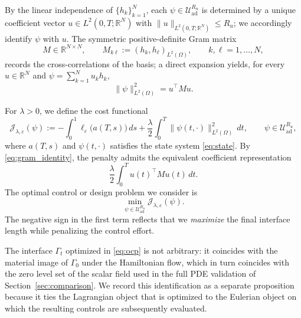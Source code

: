 \documentclass[12pt, reqno]{amsart}
\theoremstyle{plain}
\theoremstyle{definition}
\numberwithin{equation}{section}
\numberwithin{figure}{section}
\numberwithin{algorithm}{section}
\begin{document}
By the linear independence of $\{h_k\}_{k=1}^N$, each $\psi\in\mathcal U_{\mathrm{ad}}^{R_u}$ is determined by a unique coefficient vector $u\in L^2(0,T;\mathbb R^N)$ with $\|u\|_{L^2(0,T;\mathbb R^N)}\le R_u$; we accordingly identify $\psi$ with $u$. The symmetric positive-definite Gram matrix
\begin{equation}\label{eq:gram}
M\in\mathbb R^{N\times N},\qquad M_{k\ell}:=(h_k,h_\ell)_{L^2(\Omega)},\qquad k,\ell=1,\dots,N,
\end{equation}
records the cross-correlations of the basis; a direct expansion yields, for every $u\in\mathbb R^N$ and $\psi=\sum_{k=1}^N u_k h_k$,
\begin{equation}\label{eq:gram_identity}
\|\psi\|_{L^2(\Omega)}^2=u^\top M u.
\end{equation}

For $\lambda>0$, we define the cost functional
\begin{equation}\label{eq:cost}
\mathcal{J}_{\lambda,\varepsilon}(\psi)
:=
-\int_0^1 \ell_\varepsilon\bigl(a(T,s)\bigr)\,ds
+\frac{\lambda}{2}\int_0^T \|\psi(t,\cdot)\|_{L^2(\Omega)}^2\,dt,
\qquad\psi\in\mathcal U_{\mathrm{ad}}^{R_u},
\end{equation}
where $a(T,s)$ and $\psi(t,\cdot)$ satisfies the state system  \eqref{eq:state}.
By \eqref{eq:gram_identity}, the penalty admits the equivalent coefficient representation $$\frac{\lambda}{2}\int_0^T u(t)^\top M u(t)\,dt.$$
The optimal control or design problem we consider is
\begin{equation}\label{eq:ocp}
\min_{\psi\in\mathcal{U}_{\mathrm{ad}}^{R_u}}\mathcal{J}_{\lambda,\varepsilon}(\psi).
\end{equation}
The negative sign in the first term reflects that we \emph{maximize} the final interface length while penalizing the control effort.

The interface $\Gamma_t$ optimized in \eqref{eq:ocp} is not arbitrary: it coincides with the material image of $\Gamma_0$ under the Hamiltonian flow, which in turn coincides with the zero level set of the scalar field used in the full PDE validation of Section~\ref{sec:comparison}. We record this identification as a separate proposition because it ties the Lagrangian object that is optimized to the Eulerian object on which the resulting controls are subsequently evaluated.
\end{document}
